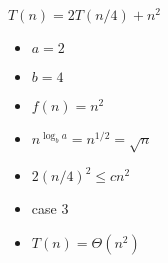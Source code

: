 \documentclass{oblivoir}
\begin{document}
\begin{multicols}{2}
\section{}

$T(n) = 2T(n/4) + n^2$


\begin{itemize}
    \item $a = 2$
    \item $b = 4$
    \item $f(n) = n^2$
    \item $n^{\log_b a} = n^{1/2} = \sqrt{n}$
    \item $2(n/4)^2  \le cn^2$
    \item case 3
    \item $T(n) = \Theta(n^2)$
\end{itemize}
\end{multicols}
\end{document}
